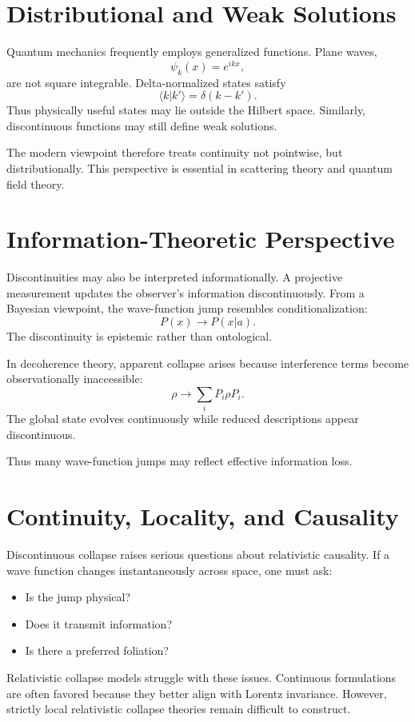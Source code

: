 \documentclass[11pt]{article}
\begin{document}
\section{Distributional and Weak Solutions}

Quantum mechanics frequently employs generalized functions.
Plane waves,
\[
\psi_k(x)=e^{ikx},
\]
are not square integrable.
Delta-normalized states satisfy
\[
\langle k|k'\rangle = \delta(k-k').
\]
Thus physically useful states may lie outside the Hilbert space.
Similarly, discontinuous functions may still define weak solutions.

The modern viewpoint therefore treats continuity not pointwise, 
but distributionally.
This perspective is essential in scattering theory and quantum 
field theory.

\section{Information-Theoretic Perspective}

Discontinuities may also be interpreted informationally.
A projective measurement updates the observer’s information discontinuously.
From a Bayesian viewpoint, the wave-function jump resembles 
conditionalization:
\[
P(x) \to P(x|a).
\]
The discontinuity is epistemic rather than ontological.

In decoherence theory, apparent collapse arises because 
interference terms become observationally inaccessible:
\[
\rho \to \sum_i P_i \rho P_i.
\]
The global state evolves continuously while reduced descriptions appear discontinuous.

Thus many wave-function jumps may reflect effective information loss.

\section{ Continuity, Locality, and Causality}

Discontinuous collapse raises serious questions about relativistic causality.
If a wave function changes instantaneously across space, one must ask:
\begin{itemize}
   \item Is the jump physical?
   \item Does it transmit information?
   \item Is there a preferred foliation?
\end{itemize}
Relativistic collapse models struggle with these issues.
Continuous formulations are often favored because they better 
align with Lorentz invariance.
However, strictly local relativistic collapse theories 
remain difficult to construct.
\end{document}

